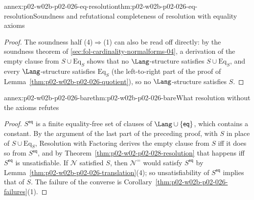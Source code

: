 \begin{annexitem}{annex:p02-w02b-p02-026-eq-resolution}{thm:p02-w02b-p02-026-eq-resolution}{Soundness and refutational completeness of resolution with equality axioms}
\begin{proof}
The soundness half (4)\(\Rightarrow\)(1) can also be read off directly: by
the soundness theorem of \cref{sec:fol-cardinality-normalforms-04}, a
derivation of the empty clause from \(S\cup\mathrm{Eq}_S\) shows that no
\(\Lang\)-structure satisfies \(S\cup\mathrm{Eq}_S\), and every
\(\Lang\)-structure satisfies \(\mathrm{Eq}_S\) (the left-to-right part of the
proof of Lemma~\ref{thm:p02-w02b-p02-026-quotient}), so no
\(\Lang\)-structure satisfies \(S\).
\end{proof}
\end{annexitem}

\begin{annexitem}{annex:p02-w02b-p02-026-bare}{thm:p02-w02b-p02-026-bare}{What resolution without the axioms refutes}
\begin{proof}
\(S^{\mathsf{eq}}\) is a finite equality-free set of clauses of
\(\Lang\cup\{\mathsf{eq}\}\), which contains a constant.  By the argument of
the last part of the preceding proof, with \(S\) in place of
\(S\cup\mathrm{Eq}_S\), Resolution with Factoring derives the empty clause
from \(S\) iff it does so from \(S^{\mathsf{eq}}\), and by
Theorem~\ref{thm:p02-w02-p02-028-resolution} that happens iff
\(S^{\mathsf{eq}}\) is unsatisfiable.  If \(\mathcal N\) satisfied \(S\), then
\(\mathcal N^{=}\) would satisfy \(S^{\mathsf{eq}}\) by
Lemma~\ref{thm:p02-w02b-p02-026-translation}(4); so unsatisfiability of
\(S^{\mathsf{eq}}\) implies that of \(S\).  The failure of the converse is
Corollary~\ref{thm:p02-w02b-p02-026-failures}(1).
\end{proof}
\end{annexitem}

